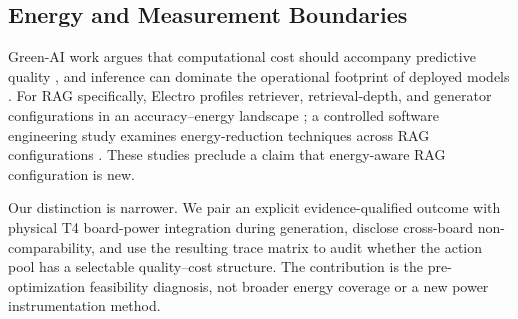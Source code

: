 \subsection{Energy and Measurement Boundaries}

Green-AI work argues that computational cost should accompany predictive quality
\cite{SchwartzEtAl2020GreenAI,StrubellEtAl2019EnergyNLP,
HendersonEtAl2020EnergyReporting}, and inference can dominate the operational
footprint of deployed models \cite{LuccioniEtAl2024PowerHungry}. For RAG specifically,
Electro profiles retriever, retrieval-depth, and generator configurations in an
accuracy--energy landscape \cite{PanEtAl2025Electro}; a controlled software
engineering study examines energy-reduction techniques across RAG configurations
\cite{GuoEtAl2026RAGEnergy}. These studies preclude a claim that energy-aware RAG
configuration is new.

Our distinction is narrower. We pair an explicit evidence-qualified outcome with
physical T4 board-power integration during generation, disclose cross-board
non-comparability, and use the resulting trace matrix to audit whether the action
pool has a selectable quality--cost structure. The contribution is the
pre-optimization feasibility diagnosis, not broader energy coverage or a new power
instrumentation method.
